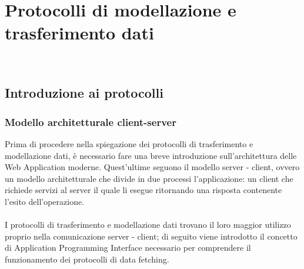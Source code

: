 
\chapter{Protocolli di modellazione e trasferimento dati}
\label{cap:protocolli-trasmissione-dati}

\\

\section{Introduzione ai protocolli}
\subsection*{Modello architetturale client-server}
\label{client-server}
Prima di procedere nella spiegazione dei protocolli di trasferimento e modellazione dati, è necessario fare una breve introduzione sull'architettura delle Web Application moderne. Quest'ultime seguono il modello server - client, ovvero un modello architetturale che divide in due processi l'applicazione: un client che richiede servizi al server il quale li esegue ritornando una risposta contenente l'esito dell'operazione. \\\\
I protocolli di trasferimento e modellazione dati trovano il loro maggior utilizzo proprio nella comunicazione server - client; di seguito viene introdotto il concetto di Application Programming Interface necessario per comprendere il funzionamento dei protocolli di data fetching.

